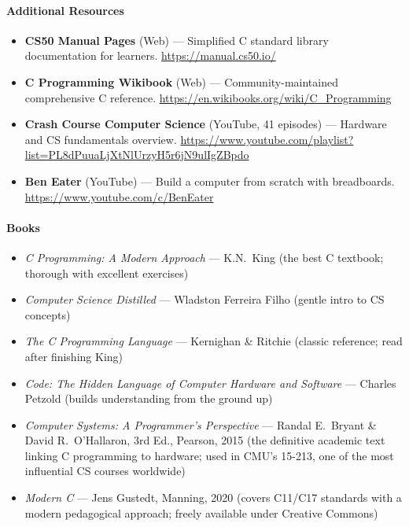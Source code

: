 \documentclass[11pt, a4paper, oneside]{report}
\begin{document}
\paragraph{Additional Resources}
\begin{itemize}[leftmargin=*]
\item \textbf{CS50 Manual Pages} (Web) --- Simplified C standard library documentation for learners. \url{https://manual.cs50.io/}
\item \textbf{C Programming Wikibook} (Web) --- Community-maintained comprehensive C reference. \url{https://en.wikibooks.org/wiki/C_Programming}
\item \textbf{Crash Course Computer Science} (YouTube, 41 episodes) --- Hardware and CS fundamentals overview. \url{https://www.youtube.com/playlist?list=PL8dPuuaLjXtNlUrzyH5r6jN9ulIgZBpdo}
\item \textbf{Ben Eater} (YouTube) --- Build a computer from scratch with breadboards. \url{https://www.youtube.com/c/BenEater}
\end{itemize}

\paragraph{Books}
\begin{itemize}[leftmargin=*]
\item \emph{C Programming: A Modern Approach} --- K.N.\ King (the best C textbook; thorough with excellent exercises)
\item \emph{Computer Science Distilled} --- Wladston Ferreira Filho (gentle intro to CS concepts)
\item \emph{The C Programming Language} --- Kernighan \& Ritchie (classic reference; read after finishing King)
\item \emph{Code: The Hidden Language of Computer Hardware and Software} --- Charles Petzold (builds understanding from the ground up)

\item \emph{Computer Systems: A Programmer's Perspective} --- Randal E.\ Bryant \& David R.\ O'Hallaron, 3rd Ed., Pearson, 2015 (the definitive academic text linking C programming to hardware; used in CMU's 15-213, one of the most influential CS courses worldwide)
\item \emph{Modern C} --- Jens Gustedt, Manning, 2020 (covers C11/C17 standards with a modern pedagogical approach; freely available under Creative Commons)
\end{itemize}
\end{document}
